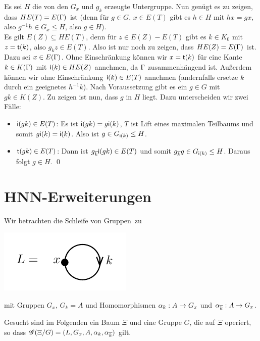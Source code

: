 \documentclass[a4paper, 12pt, twoside]{article}
\begin{document}
\bew Es sei $H$ die von den $G_x$ und $g_k$ erzeugte Untergruppe.
Nun genügt es zu zeigen, dass $H E(T)=E(\Gamma)$ ist (denn für $g\in G$,
$x\in E(T)$ gibt es $h\in H$ mit $hx=gx$, also
$g^{-1}h\in G_x \leq H$, also $g\in H$).\\
Es gilt $E(Z)\subseteq H E(T)$, denn für $z\in E(Z)-E(T)$ gibt es
$k\in K_0$ mit $z=\mathsf{t}(k)$, also $g_k z \in E(T)$.
Also ist nur noch zu zeigen, dass $HE(Z)=E(\Gamma)$ ist.
Dazu sei $x\in E(\Gamma)$. Ohne Einschränkung können wir $x=\mathsf{t}(k)$
für eine Kante $k\in K(\Gamma)$ mit $\mathsf{i}(k)\in HE(Z)$ annehmen,
da $\Gamma$ zusammenhängend ist. Außerdem können wir ohne Einschränkung
$\mathsf{i}(k)\in E(T)$ annehmen (andernfalls ersetze $k$ durch ein
geeignetes $h^{-1}k$).
Nach Voraussetzung gibt es ein $g\in G$ mit $gk\in K(Z)$.
Zu zeigen ist nun, dass $g$ in $H$ liegt. Dazu unterscheiden wir
zwei Fälle:
\begin{itemize}
\item
$\mathsf{i}(gk)\in E(T)$: Es ist $\mathsf{i}(gk)=g\mathsf{i}(k)$, $T$ ist Lift eines
maximalen Teilbaums und somit $g\mathsf{i}(k)=\mathsf{i}(k)$.
Also ist $g\in G_{\mathsf{i}(k)}\leq H$.\\
\item
$\mathsf{t}(gk)\in E(T)$: Dann ist $g_{\overline{k}} \mathsf{i}(gk)\in E(T)$
und somit $g_{\overline{k}} g \in G_{\mathsf{i}(k)}\leq H$.
Daraus folgt $g\in H$.
\qed
\end{itemize}


\section{HNN-Erweiterungen}\label{sec_hnn}

Wir betrachten die \glqq Schleife von Gruppen\grqq\ zu
\begin{center}
	\includegraphics{grugraImages/L}
\end{center}
mit Gruppen $G_x$, $G_k=A$ und Homomorphismen
$\alpha_k:A\rightarrow G_x$ und $\alpha_{\overline{k}}:A\rightarrow G_x$.

Gesucht sind im Folgenden ein Baum $\Xi$ und eine Gruppe $G$,
die auf $\Xi$ operiert, so dass
$\mathscr{G}(\Xi/G) = (L,G_x,A,\alpha_k,\alpha_{\overline{k}})$ gilt.
\end{document}
